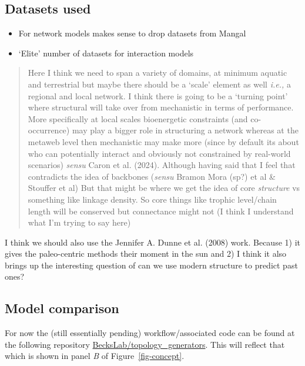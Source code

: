 \documentclass[
  letterpaper,
  DIV=11,
  numbers=noendperiod]{scrartcl}
\begin{document}
\subsection{Datasets used}\label{datasets-used}

\begin{itemize}
\item
  For network models makes sense to drop datasets from Mangal
\item
  `Elite' number of datasets for interaction models
\end{itemize}

\begin{quote}
Here I think we need to span a variety of domains, at minimum aquatic
and terrestrial but maybe there should be a `scale' element as well
\emph{i.e.,} a regional and local network. I think there is going to be
a `turning point' where structural will take over from mechanistic in
terms of performance. More specifically at local scales bioenergetic
constraints (and co-occurrence) may play a bigger role in structuring a
network whereas at the metaweb level then mechanistic may make more
(since by default its about who can potentially interact and obviously
not constrained by real-world scenarios) \emph{sensu} Caron et al.
(2024). Although having said that I feel that contradicts the idea of
backbones (\emph{sensu} Bramon Mora (sp?) et al \& Stouffer et al) But
that might be where we get the idea of core \emph{structure} vs
something like linkage density. So core things like trophic level/chain
length will be conserved but connectance might not (I think I understand
what I'm trying to say here)
\end{quote}

I think we should also use the Jennifer A. Dunne et al. (2008) work.
Because 1) it gives the paleo-centric methods their moment in the sun
and 2) I think it also brings up the interesting question of can we use
modern structure to predict past ones?

\subsection{Model comparison}\label{model-comparison}

For now the (still essentially pending) workflow/associated code can be
found at the following repository
\href{https://github.com/BecksLab/topology_generators}{BecksLab/topology\_generators}.
This will reflect that which is shown in panel \emph{B} of
Figure~\ref{fig-concept}.
\end{document}
